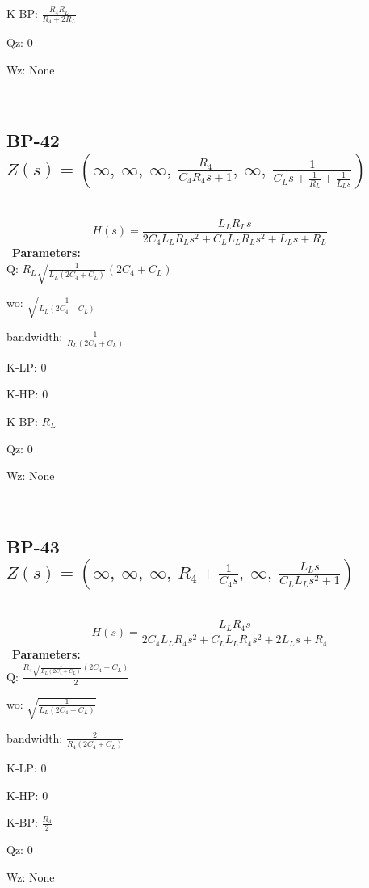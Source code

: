 \documentclass{article}
\begin{document}
K-BP: $\frac{R_{4} R_{L}}{R_{4} + 2 R_{L}}$\ 

Qz: $0$\ 

Wz: $\text{None}$\ 

\ 

\subsection{BP-42 $Z(s) = \left( \infty, \  \infty, \  \infty, \  \frac{R_{4}}{C_{4} R_{4} s + 1}, \  \infty, \  \frac{1}{C_{L} s + \frac{1}{R_{L}} + \frac{1}{L_{L} s}}\right)$ } \ 
\textbf{\[H(s) = \frac{L_{L} R_{L} s}{2 C_{4} L_{L} R_{L} s^{2} + C_{L} L_{L} R_{L} s^{2} + L_{L} s + R_{L}}\] } \ 
\textbf{Parameters:}\\ 

Q: $R_{L} \sqrt{\frac{1}{L_{L} \left(2 C_{4} + C_{L}\right)}} \left(2 C_{4} + C_{L}\right)$\ 

wo: $\sqrt{\frac{1}{L_{L} \left(2 C_{4} + C_{L}\right)}}$\ 

bandwidth: $\frac{1}{R_{L} \left(2 C_{4} + C_{L}\right)}$\ 

K-LP: $0$\ 

K-HP: $0$\ 

K-BP: $R_{L}$\ 

Qz: $0$\ 

Wz: $\text{None}$\ 

\ 

\subsection{BP-43 $Z(s) = \left( \infty, \  \infty, \  \infty, \  R_{4} + \frac{1}{C_{4} s}, \  \infty, \  \frac{L_{L} s}{C_{L} L_{L} s^{2} + 1}\right)$ } \ 
\textbf{\[H(s) = \frac{L_{L} R_{4} s}{2 C_{4} L_{L} R_{4} s^{2} + C_{L} L_{L} R_{4} s^{2} + 2 L_{L} s + R_{4}}\] } \ 
\textbf{Parameters:}\\ 

Q: $\frac{R_{4} \sqrt{\frac{1}{L_{L} \left(2 C_{4} + C_{L}\right)}} \left(2 C_{4} + C_{L}\right)}{2}$\ 

wo: $\sqrt{\frac{1}{L_{L} \left(2 C_{4} + C_{L}\right)}}$\ 

bandwidth: $\frac{2}{R_{4} \left(2 C_{4} + C_{L}\right)}$\ 

K-LP: $0$\ 

K-HP: $0$\ 

K-BP: $\frac{R_{4}}{2}$\ 

Qz: $0$\ 

Wz: $\text{None}$\ 
\end{document}
